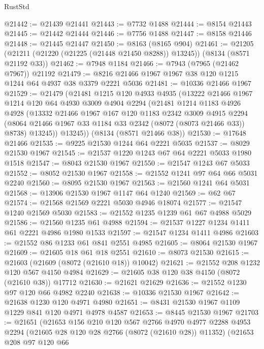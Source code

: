 \begin{lexlean}{RustStd}
\begin{coremodule}
@21442 := @21439 @21441
@21443 := @7732 @1488
@21444 := @8154 @21443
@21445 := @21442 @21444
@21446 := @7756 @1488
@21447 := @8158 @21446
@21448 := @21445 @21447
@21450 := @8163 (@8165 @904)
@21461 := @21205 (@21211 (@21220 (@21225 (@21448 @21450 @8288)) @13245)) (@8134 (@8571 @21192 @33))
@21462 := @7948 @1184
@21466 := @7943 (@7965 (@21462 @7967)) @21192
@21479 := @8216 @21466 @1967 @1967 @38 @120 @1215 @1244 @64 @4937 @38 @3379 @2221 @5036
@21481 := @10336 @21466 @1967
@21529 := @21479
    (@21481
      @1215
      @120
      @4933
      @4935
      (@13222
        @21466
        @1967
        @1214
        @120
        @64
        @4930
        @3009
        @4904
        @2294
        (@21481
          @1214
          @1183
          @4926
          @4928
          (@13332
            @21466
            @1967
            @167
            @120
            @1183
            @2342
            @3009
            @4915
            @2294
            (@8064 @21466 @1967 @33 @1184 @33 @2342 (@8072 (@8073 @21466 @33)) @8738)
            @13245))
        @13245))
    (@8134 (@8571 @21466 @38))
@21530 := @17648 @21466
@21535 := @9225 @21530 @1244 @64 @2221 @5035
@21537 := @8029 @21530 @1967
@21545 := @21537 @1220 @1243 @67 @64 @2221 @5033 @1980 @1518
@21547 := @8043 @21530 @1967
@21550 := @21547 @1243 @67 @5033
@21552 := @8052 @21530 @1967
@21558 := @21552 @1241 @97 @64 @66 @5031 @2240
@21560 := @8095 @21530 @1967
@21563 := @21560 @1241 @64 @5031
@21568 := @13906 @21530 @1967 @1147 @64 @1240
@21569 := @62 @67
@21574 := @21568 @21569 @2221 @5030 @4946 @18074
@21577 := @21547 @1240 @21569 @5030
@21583 := @21552 @1235 @1239 @61 @67 @4988 @5029
@21586 := @21560 @1235 @61 @4988
@21594 := @21537 @1227 @1234 @1411 @61 @2221 @4986 @1980 @1533
@21597 := @21547 @1234 @1411 @4986
@21603 := @21552 @86 @1233 @61 @841 @2551 @4985
@21605 := @8064 @21530 @1967
@21609 := @21605 @18 @61 @18 @2551
@21610 := @8073 @21530
@21615 := @21603 (@21609 (@8072 (@21610 @18)) @10042)
@21621 := @21552 @208 @1232 @120 @567 @4150 @4984
@21629 := @21605 @38 @120 @38 @4150 (@8072 (@21610 @38)) @17712
@21630 := @21621 @21629
@21636 := @21552 @1230 @97 @120 @66 @4982 @2240
@21638 := @10336 @21530 @1967
@21642 := @21638 @1230 @120 @4971 @4980
@21651 := @8431 @21530 @1967 @1109 @1229 @841 @120 @4971 @4978 @4587
@21653 := @8445 @21530 @1967
@21703 := @21651
    (@21653
      @156
      @210
      @120
      @567
      @2766
      @4970
      @4977
      @2288
      @4953
      @2294
      (@21605 @28 @120 @28 @2766 (@8072 (@21610 @28)) @11352)
      (@21653
        @208
        @97
        @120
        @66

\end{coremodule}
\end{lexlean}
